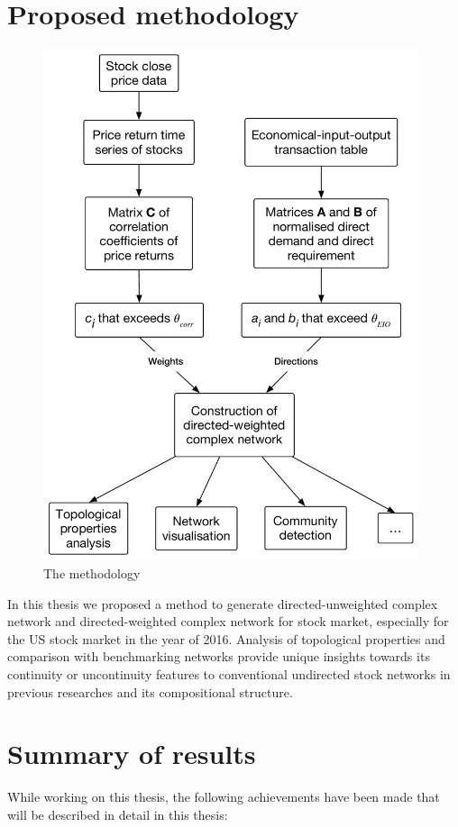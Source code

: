 \section{Proposed methodology}
\begin{figure}
	\begin{center}
		\includegraphics[width=11cm]{methodology_diagram}
	\end{center}
	\caption{The methodology}
	\label{fig:methodology_diagram}
\end{figure}

In this thesis we proposed a method to generate directed-unweighted complex network and directed-weighted complex network for stock market, especially for the US stock market in the year of 2016. Analysis of topological properties and comparison with benchmarking networks provide unique insights towards its continuity or uncontinuity features to conventional undirected stock networks in previous researches and its compositional structure.

\section{Summary of results}
While working on this thesis, the following achievements have been made that will be described in detail in this thesis:

